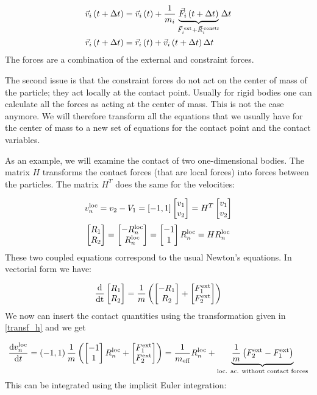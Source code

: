 \begin{align*}
\vec{v}_i \kl{t+\Delta t} &=  \vec{v}_i \kl{t} + \frac{1}{m_i} \underbrace{\vec{F}_i \kl{t+\Delta t}}_{\vec{F}_i^{\,\text{ext}} + \vec{R}_i^{\,\text{constr}}} \Delta t \\
\vspace{0.1cm}
\vec{r}_i \kl{t+\Delta t} &=  \vec{r}_i \kl{t} + \vec{v}_i \kl{t+\Delta t} \Delta t 
\end{align*}
The forces are a combination of the external and constraint forces.

The second issue is that the constraint forces do not act on the center of mass of the particle; they act locally at the contact point. Usually for rigid bodies one can calculate all the forces as acting at the center of mass. This is not the case anymore. We will therefore transform all the equations that we usually have for the center of mass to a new set of equations for the contact point and the contact variables.


As an example, we will examine the contact of two one-dimensional bodies. The matrix $H$ transforms the contact forces (that are local forces) into forces between the particles. The matrix $H^T$ does the same for the velocities:

\begin{equation*}
v_n^{\text{loc}} = v_2-V_1 = \left[-1,1\right]  \begin{bmatrix} v_1\\ v_2 \end{bmatrix} = H^T  \begin{bmatrix} v_1\\ v_2 \end{bmatrix}
\end{equation*}
\begin{equation}
 \begin{bmatrix} R_1\\ R_2 \end{bmatrix} =  \begin{bmatrix} -R_n^{\text{loc}}\\ R_n^{\text{loc}} \end{bmatrix} =   \begin{bmatrix} -1\\ 1 \end{bmatrix} R_n^{\text{loc}} = HR_n^{\text{loc}}
\label{transf_h}
\end{equation}
These two coupled equations correspond to the usual Newton's equations. In vectorial form we have:



\begin{equation}
\frac{\text{d}}{\text{dt}} \begin{bmatrix} R_1\\ R_2 \end{bmatrix} =\frac{1}{m} \left( \begin{bmatrix} -R_1\\ R_2 \end{bmatrix} + \begin{bmatrix} F_1^{\text{ext}}\\ F_2^{\text{ext}} \end{bmatrix}\right) 
\end{equation}
We now can insert the contact quantities using the transformation given in \eqref{transf_h} and we get

\begin{equation}
\frac{\text{d} v_n^{\text{loc}}}{\text{d} t} = \left(-1,1\right) \frac{1}{m}  \left( \begin{bmatrix} -1\\ 1 \end{bmatrix} R_n^{\text{loc}} + \begin{bmatrix} F_1^{\text{ext}}\\ F_2^{\text{ext}} \end{bmatrix}\right) = \frac{1}{m_\text{eff}} R_n^{\text{loc}} +\underbrace{ \frac{1}{m} \left(F_2^{\text{ext}}-F_1^{\text{ext}}\right)}_{\text{loc. ac. without contact forces}}
\end{equation}
This can be integrated using the implicit Euler integration:

